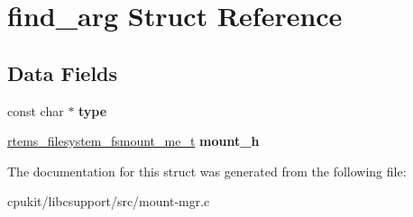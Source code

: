 \hypertarget{structfind__arg}{}\section{find\+\_\+arg Struct Reference}
\label{structfind__arg}
\subsection*{Data Fields}
\begin{DoxyCompactItemize}
\item 
\mbox{\label{structfind__arg_ae6d37cde095c1d49fbd8be5cbcb8f444}} 
const char $\ast$ {\bfseries type}
\item 
\mbox{\label{structfind__arg_afac3f9c624b426e3fbf4703e45b36c94}} 
\mbox{\hyperlink{group__LibIOFSOps_gab86f790d75005100fc4d847f7cdc8aef}{rtems\+\_\+filesystem\+\_\+fsmount\+\_\+me\+\_\+t}} {\bfseries mount\+\_\+h}
\end{DoxyCompactItemize}


The documentation for this struct was generated from the following file\+:\begin{DoxyCompactItemize}
\item 
cpukit/libcsupport/src/mount-\/mgr.\+c\end{DoxyCompactItemize}

